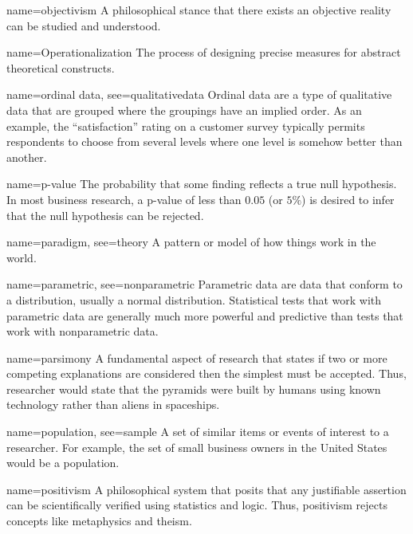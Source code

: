 {name={objectivism}}
{%
	A philosophical stance that there exists an objective reality can be studied and understood.
}


{name={Operationalization}}
{%
	 The process of designing precise measures for abstract theoretical constructs. 
}

{name={ordinal data},
	see={qualitativedata}}
{%
	Ordinal data are a type of qualitative data that are grouped where the groupings have an implied order. As an example, the ``satisfaction'' rating on a customer survey typically permits respondents to choose from several levels where one level is somehow better than another.
}

{name={p-value}}
{%
	The probability that some finding reflects a true null hypothesis. In most business research, a p-value of less than $ 0.05 $ (or $ 5\% $) is desired to infer that the null hypothesis can be rejected.
}

{name={paradigm},
	see={theory}}
{%
	A pattern or model of how things work in the world. 
}

{name={parametric},
	see={nonparametric}}
{%
	Parametric data are data that conform to a distribution, usually a normal distribution. Statistical tests that work with parametric data are generally much more powerful and predictive than tests that work with nonparametric data.
}

	{name={parsimony}}
	{%
		A fundamental aspect of research that states if two or more competing explanations are considered then the simplest must be accepted. Thus, researcher would state that the pyramids were built by humans using known technology rather than aliens in spaceships.
	}

{name={population},
 see={sample}}
{%
	A set of similar items or events of interest to a researcher. For example, the set of small business owners in the United States would be a population.
}

{name={positivism}}
{%
	A philosophical system that posits that any justifiable assertion can be scientifically verified using statistics and logic. Thus, positivism rejects concepts like metaphysics and theism.
}

